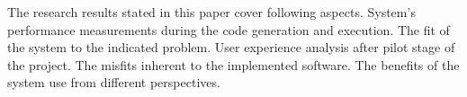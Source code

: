 The research results stated in this paper cover following aspects. System's performance measurements during the code generation and execution. The fit of the system to the indicated problem. User experience analysis after pilot stage of the project. The misfits inherent to the implemented software. The benefits of the system use from different perspectives. 
%
%
%
%
%
%
%

